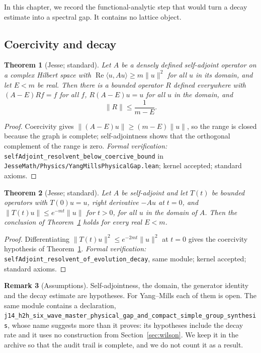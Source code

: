 \documentclass[11pt]{article}
\numberwithin{equation}{subsection}
\theoremstyle{plain}
\newtheorem{theorem}{Theorem}[subsection]
\theoremstyle{definition}
\newtheorem{remark}[theorem]{Remark}
\begin{document}
In this chapter, we record the functional-analytic step that would turn a decay estimate into a
spectral gap. It contains no lattice object.

\subsection{Coercivity and decay}

\begin{theorem}[Jesse; standard]\label{thm:resolvent}
Let $A$ be a densely defined self-adjoint operator on a complex Hilbert space with
$\operatorname{Re}\langle u,Au\rangle\ge m\|u\|^2$ for all $u$ in its domain, and let $E<m$ be
real. Then there is a bounded operator $R$ defined everywhere with $(A-E)Rf=f$ for all $f$,
$R(A-E)u=u$ for all $u$ in the domain, and
\begin{equation}\label{eq:res}
\|R\|\le\frac{1}{m-E}.
\end{equation}
\end{theorem}
\begin{proof}
Coercivity gives $\|(A-E)u\|\ge(m-E)\|u\|$, so the range is closed because the graph is
complete; self-adjointness shows that the orthogonal complement of the range is zero.
\emph{Formal verification:} \texttt{self\allowbreak{}Adjoint\_\allowbreak{}resolvent\_\allowbreak{}below\_\allowbreak{}coercive\_\allowbreak{}bound} in
\texttt{Jesse\allowbreak{}Math/\allowbreak{}Physics/\allowbreak{}Yang\allowbreak{}Mills\allowbreak{}Physical\allowbreak{}Gap.\allowbreak{}lean}; kernel accepted; standard axioms.
\end{proof}

\begin{theorem}[Jesse; standard]\label{thm:resolventdecay}
Let $A$ be self-adjoint and let $T(t)$ be bounded operators with $T(0)u=u$, right derivative
$-Au$ at $t=0$, and $\|T(t)u\|\le e^{-mt}\|u\|$ for $t>0$, for all $u$ in the domain of $A$.
Then the conclusion of Theorem~\ref{thm:resolvent} holds for every real $E<m$.
\end{theorem}
\begin{proof}
Differentiating $\|T(t)u\|^2\le e^{-2mt}\|u\|^2$ at $t=0$ gives the coercivity hypothesis of
Theorem~\ref{thm:resolvent}. \emph{Formal verification:}
\texttt{self\allowbreak{}Adjoint\_\allowbreak{}resolvent\_\allowbreak{}of\_\allowbreak{}evolution\_\allowbreak{}decay}, same module; kernel accepted; standard axioms.
\end{proof}

\begin{remark}[Assumptions]
Self-adjointness, the domain, the generator identity and the decay estimate are hypotheses.
For Yang--Mills each of them is open. The same module contains a declaration,
\texttt{j14\_\allowbreak{}h2h\_\allowbreak{}six\_\allowbreak{}wave\_\allowbreak{}master\_\allowbreak{}physical\_\allowbreak{}gap\_\allowbreak{}and\_\allowbreak{}compact\_\allowbreak{}simple\_\allowbreak{}group\_\allowbreak{}synthesis}, whose name
suggests more than it proves: its hypotheses include the decay rate and it uses no
construction from Section~\ref{sec:wilson}. We keep it in the archive so that the audit trail
is complete, and we do not count it as a result.
\end{remark}
\end{document}
